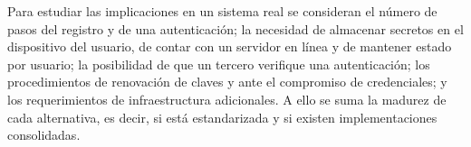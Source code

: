Para estudiar las implicaciones en un sistema real se consideran el número de pasos del
registro y de una autenticación; la necesidad de almacenar secretos en el dispositivo
del usuario, de contar con un servidor en línea y de mantener estado por usuario; la
posibilidad de que un tercero verifique una autenticación; los procedimientos de
renovación de claves y ante el compromiso de credenciales; y los requerimientos de
infraestructura adicionales. A ello se suma la madurez de cada alternativa, es decir,
si está estandarizada y si existen implementaciones consolidadas.
